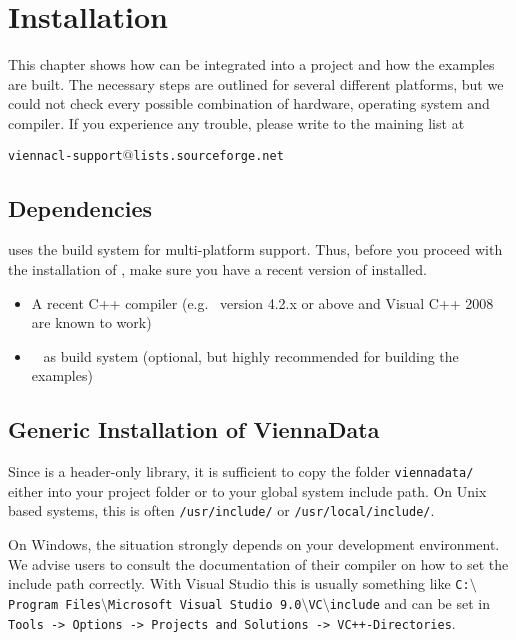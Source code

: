\chapter{Installation}

This chapter shows how {\ViennaData} can be integrated into a project and how
the
examples are built. The necessary steps are outlined for several different
platforms, but we could not check every possible combination of hardware,
operating system and compiler. If you experience any trouble, please write to
the maining list at \\
\begin{center}
\texttt{viennacl-support$@$lists.sourceforge.net} 
\end{center}


\section{Dependencies}
\label{dependencies}
{\ViennaData} uses the {\CMake} build system for multi-platform support.
Thus, before you proceed with the installation of {\ViennaData}, make sure you
have a recent version of {\CMake} installed.

\begin{itemize}
 \item A recent C++ compiler (e.g.~{\GCC} version 4.2.x or above and Visual C++
2008 are known to work)
 \item {\CMake}~\cite{cmake} as build system (optional, but highly recommended
for building the examples)
\end{itemize}


\section{Generic Installation of ViennaData} \label{sec:viennacl-installation}
Since {\ViennaData} is a header-only library, it is sufficient to copy the
folder
\lstinline|viennadata/| either into your project folder or to your global system
include path. On Unix based systems, this is often \lstinline|/usr/include/| or
\lstinline|/usr/local/include/|.

On Windows, the situation strongly depends on your development environment. We
advise users
to consult the documentation of their compiler on how to set the include
path correctly. With Visual Studio this is usually something like
\texttt{C:$\setminus$Program Files$\setminus$Microsoft Visual Studio
9.0$\setminus$VC$\setminus$include}
and can be set in \texttt{Tools -> Options -> Projects and Solutions ->
VC++-\-Directories}. 


